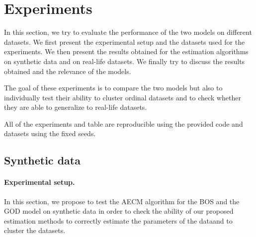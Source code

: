 \section{Experiments}
In this section, we try to evaluate the performance of the two models on different datasets. We first present the experimental setup and the datasets used for the experiments. We then present the results obtained for the estimation algorithms on synthetic data and on real-life datasets. We finally try to discuss the results obtained and the relevance of the models. 

The goal of these experiments is to compare the two models but also to individually test their ability to cluster ordinal datasets and to check whether they are able to generalize to real-life datasets.

All of the experiments and table are reproducible using the provided code and datasets using the fixed seeds.

\subsection{Synthetic data}
\paragraph{Experimental setup.}
In this section, we propose to test the AECM algorithm for the BOS and the GOD model on synthetic data in order to check the ability of our proposed estimation methods to correctly estimate the parameters of the dataand to cluster the datasets. 

